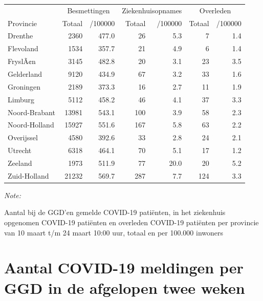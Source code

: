 \documentclass[
  english,
  man,floatsintext]{apa6}
\begin{document}
\begin{table}
\centering
\begin{threeparttable}
\begin{tabular}{lrrrrrr}
\toprule
\multicolumn{1}{c}{ } & \multicolumn{2}{c}{Besmettingen} & \multicolumn{2}{c}{Ziekenhuisopnames} & \multicolumn{2}{c}{Overleden} \\
\cmidrule(l{3pt}r{3pt}){2-3} \cmidrule(l{3pt}r{3pt}){4-5} \cmidrule(l{3pt}r{3pt}){6-7}
Provincie & Totaal & /100000 & Totaal & /100000 & Totaal & /100000\\
\midrule
Drenthe & 2360 & 477.0 & 26 & 5.3 & 7 & 1.4\\
Flevoland & 1534 & 357.7 & 21 & 4.9 & 6 & 1.4\\
FryslÃ¢n & 3145 & 482.8 & 20 & 3.1 & 23 & 3.5\\
Gelderland & 9120 & 434.9 & 67 & 3.2 & 33 & 1.6\\
Groningen & 2189 & 373.3 & 16 & 2.7 & 11 & 1.9\\
Limburg & 5112 & 458.2 & 46 & 4.1 & 37 & 3.3\\
Noord-Brabant & 13981 & 543.1 & 100 & 3.9 & 58 & 2.3\\
Noord-Holland & 15927 & 551.6 & 167 & 5.8 & 63 & 2.2\\
Overijssel & 4580 & 392.6 & 33 & 2.8 & 24 & 2.1\\
Utrecht & 6318 & 464.1 & 70 & 5.1 & 17 & 1.2\\
Zeeland & 1973 & 511.9 & 77 & 20.0 & 20 & 5.2\\
Zuid-Holland & 21232 & 569.7 & 287 & 7.7 & 124 & 3.3\\
\bottomrule
\end{tabular}
\begin{tablenotes}
\item \textit{Note: } 
\item Aantal bij de GGD’en gemelde COVID-19 patiënten, in het ziekenhuis opgenomen COVID-19 patiënten en overleden COVID-19 patiënten per provincie van 10 maart t/m 24 maart 10:00 uur, totaal en per 100.000 inwoners
\end{tablenotes}
\end{threeparttable}
\end{table}

\newpage

\hypertarget{aantal-covid-19-meldingen-per-ggd-in-de-afgelopen-twee-weken}{%
\section{Aantal COVID-19 meldingen per GGD in de afgelopen twee weken}\label{aantal-covid-19-meldingen-per-ggd-in-de-afgelopen-twee-weken}}
\end{document}
